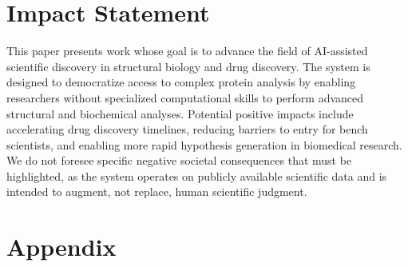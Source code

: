 \documentclass{article}
\begin{document}
\section*{Impact Statement}

This paper presents work whose goal is to advance the field of AI-assisted scientific discovery in structural biology and drug discovery. The system is designed to democratize access to complex protein analysis by enabling researchers without specialized computational skills to perform advanced structural and biochemical analyses. Potential positive impacts include accelerating drug discovery timelines, reducing barriers to entry for bench scientists, and enabling more rapid hypothesis generation in biomedical research. We do not foresee specific negative societal consequences that must be highlighted, as the system operates on publicly available scientific data and is intended to augment, not replace, human scientific judgment.





\newpage
\appendix
\onecolumn

\section{Appendix}
\end{document}
